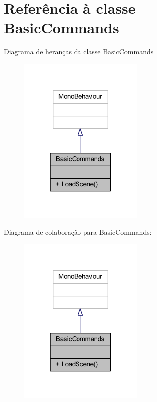 \section{Referência à classe Basic\+Commands}
\label{class_basic_commands}


Diagrama de heranças da classe Basic\+Commands
\nopagebreak
\begin{figure}[H]
\begin{center}
\leavevmode
\includegraphics[width=171pt]{class_basic_commands__inherit__graph}
\end{center}
\end{figure}


Diagrama de colaboração para Basic\+Commands\+:
\nopagebreak
\begin{figure}[H]
\begin{center}
\leavevmode
\includegraphics[width=171pt]{class_basic_commands__coll__graph}
\end{center}
\end{figure}
